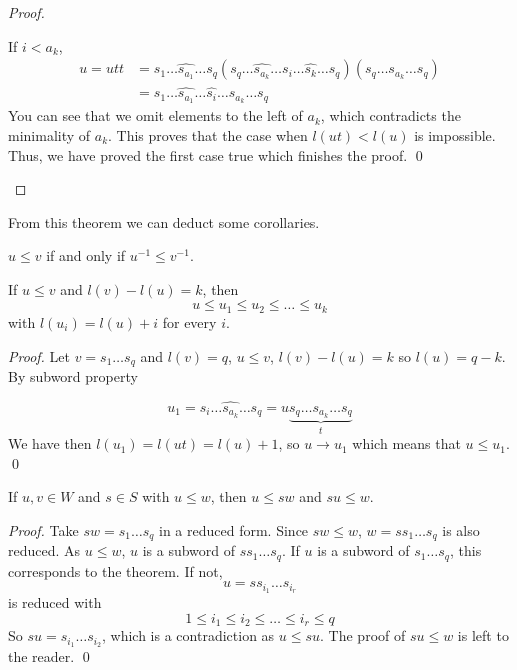\begin{proof}
\begin{itemize}
  If $i < a_k$,
  \begin{equation}
    \begin{split}
      u = utt &= s_1 \dots \hat{s_{a_1}} \dots s_q (s_q \dots \hat{s_{a_k}} \dots s_i \dots \hat{s_k} \dots s_q) (s_q \dots s_{a_k} \dots{s_q})\\
      &= s_1 \dots \hat{s_{a_1}} \dots \hat{s_i} \dots s_{a_k} \dots s_q
    \end{split}
  \end{equation}
You can see that we omit elements to the left of $a_k$, which contradicts the minimality of $a_k$. This proves that the case when $l(ut) < l(u)$ is impossible. Thus, we have proved the first case true which finishes the proof. \qed

\end{itemize}
\end{proof}

From this theorem we can deduct some corollaries.

\begin{corollary}
  $u \leq v$ if and only if $u^{-1} \leq v^{-1}$.
\end{corollary}

\begin{corollary}
  If $u \leq v$ and $l(v) - l(u) = k$, then
  \begin{equation}
    u \leq u_1 \leq u_2 \leq \dots \leq u_k
  \end{equation}
  with $l(u_i) = l(u) + i$ for every $i$.
\end{corollary}

\begin{proof}
Let $v = s_1 \dots s_q$ and $l(v) = q$, $u \leq v$, $l(v) - l(u) = k$ so $l(u) = q-k$. By subword property

\begin{equation}
  u_1 = s_i \dots \hat{s_{a_k}} \dots s_q = u\underset{t}{\underbrace{s_q \dots s_{a_k} \dots s_q}}
\end{equation}
We have then $l(u_1) = l(ut) = l(u)+1$, so $u \to u_1$ which means that $u \leq u_1$. \qed
\end{proof}

\begin{theorem}
  If $u, v \in W$ and $s \in S$ with $u \leq w$, then $u \leq sw$ and $su \leq w$.
\end{theorem}
\begin{proof}
Take $sw = s_1 \dots s_q$ in a reduced form.
Since $sw \leq w$, $w = ss_1\dots s_q$ is also reduced.
As $u \leq w$, $u$ is a subword of $ss_1 \dots s_q$. If $u$ is a subword of $s_1 \dots s_q$, this corresponds to the theorem. If not,
\begin{equation}
  u = ss_{i_1} \dots s_{i_r}
\end{equation}
is reduced with
\begin{equation}
  1 \leq i_1 \leq i_2 \leq \dots \leq i_r \leq q
\end{equation}
So $su = s_{i_1} \dots s_{i_2}$, which is a contradiction as $u \leq su$. The proof of $su \leq w$ is left to the reader. \qed
\end{proof}


